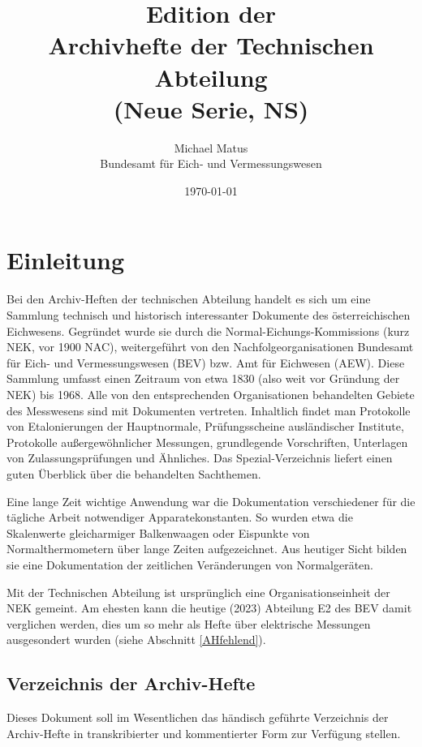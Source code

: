 \documentclass[a4paper]{scrbook}
\title{Edition der\\Archivhefte der Technischen Abteilung\\(Neue Serie, NS)}
\date{\today}
\author{Michael Matus \\ Bundesamt für Eich- und Vermessungswesen}
\begin{document}
\maketitle
\tableofcontents

\parindent0pt

\chapter{Einleitung}

Bei den \glqq Archiv-Heften der technischen Abteilung\grqq{} handelt es sich um eine Sammlung technisch und historisch interessanter Dokumente des öster\-reichi\-schen Eichwesens. Gegründet wurde sie durch die Normal-Eichungs-Komm\-iss\-ions (kurz NEK, vor 1900 NAC), weitergeführt von den Nachfolgeorganisationen Bundesamt für Eich- und Vermessungswesen (BEV) bzw. Amt für Eichwesen (AEW). Diese Sammlung umfasst einen Zeitraum von etwa 1830 (also weit vor Gründung der NEK) bis 1968. Alle von den entsprechenden Organisationen behandelten Gebiete des Messwesens sind mit Dokumenten vertreten. Inhaltlich findet man Protokolle von Etalonierungen der Hauptnormale, Prüfungsscheine ausländischer Institute, Protokolle außergewöhnlicher Messungen, grundlegende Vorschriften, Unterlagen von Zulassungsprüfungen und Ähnliches. Das Spezial-Verzeichnis liefert einen guten Überblick über die behandelten Sachthemen.

Eine lange Zeit wichtige Anwendung war die Dokumentation verschiedener für die tägliche Arbeit notwendiger Apparatekonstanten. So wurden etwa die Skalenwerte gleicharmiger Balkenwaagen oder Eispunkte von Normalthermometern über lange Zeiten aufgezeichnet. Aus heutiger Sicht bilden sie eine Dokumentation der zeitlichen Veränderungen von Normalgeräten.

Mit der \glqq Technischen Abteilung\grqq{} ist ursprünglich eine Organisationseinheit der NEK gemeint. Am ehesten kann die heutige (2023) Abteilung E2 des BEV damit verglichen werden, dies um so mehr als Hefte über elektrische Messungen ausgesondert wurden (siehe Abschnitt \ref{AHfehlend}).

\section{Verzeichnis der Archiv-Hefte}

Dieses Dokument soll im Wesentlichen das händisch geführte Verzeichnis der Archiv-Hefte in transkribierter und kommentierter Form zur Verfügung stellen. 
\end{document}
